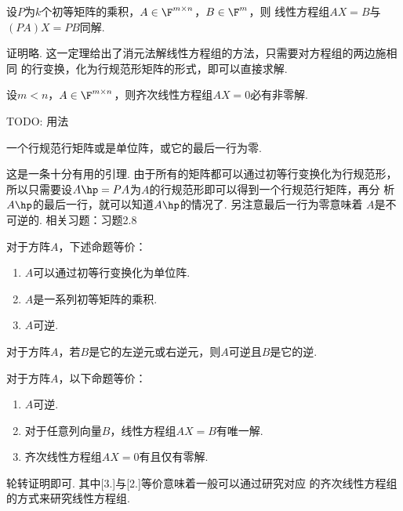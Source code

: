   \begin{thm}[Gauss消元]
    设$P$为$k$个初等矩阵的乘积，$A\in\F^{m\times n}$，$B\in\F^{m}$，则
    线性方程组$AX=B$与$(PA)X=PB$同解.
  \end{thm}
  \remark
    证明略. 这一定理给出了消元法解线性方程组的方法，只需要对方程组的两边施相同
    的行变换，化为行规范形矩阵的形式，即可以直接求解.

  \begin{lemma}[齐次线性方程组解的存在性]
    设$m<n$，$A\in\F^{m\times n}$，则齐次线性方程组$AX=0$必有非零解.
  \end{lemma}
  \remark
    TODO: 用法

  \begin{lemma}[行规范形]
    一个行规范行矩阵或是单位阵，或它的最后一行为零.
  \end{lemma}
  \remark
    这是一条十分有用的引理. 由于所有的矩阵都可以通过初等行变换化为行规范形，
    所以只需要设$A\hp=PA$为$A$的行规范形即可以得到一个行规范行矩阵，再分
    析$A\hp$的最后一行，就可以知道$A\hp$的情况了. 另注意最后一行为零意味着
    $A$是不可逆的.
    相关习题：习题2.8

  \begin{thm}[可逆的等价条件]
    对于方阵$A$，下述命题等价：
    \begin{enumerate}
      \item $A$可以通过初等行变换化为单位阵.
      \item $A$是一系列初等矩阵的乘积.
      \item $A$可逆.
    \end{enumerate}
  \end{thm}

  \begin{pos}
    对于方阵$A$，若$B$是它的左逆元或右逆元，则$A$可逆且$B$是它的逆.
  \end{pos}

  \begin{thm}[线性方程组]
    对于方阵$A$，以下命题等价：
    \begin{enumerate}
      \item $A$可逆.
      \item 对于任意列向量$B$，线性方程组$AX=B$有唯一解.
      \item 齐次线性方程组$AX=0$有且仅有零解.
    \end{enumerate}
  \end{thm}
  \remark
    轮转证明即可. 其中[3.]与[2.]等价意味着一般可以通过研究对应
    的齐次线性方程组的方式来研究线性方程组.

